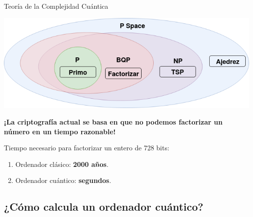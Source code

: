 \documentclass[11pt,compress]{beamer}
\begin{document}
\begin{frame}{Teoría de la Complejidad Cuántica}

  \includegraphics[width=\textwidth]{./images/complexity-zoo.png}

  \begin{tcolorbox}[colback=ChetwodeBlue!10,colframe=ChetwodeBlue!60]
    \begin{center}
      {\color{TurkishRose}\textbf{¡La criptografía actual se basa en que no podemos factorizar un número en un tiempo razonable!}}
    \end{center}
    Tiempo necesario para factorizar un entero de 728 bits:
    \begin{enumerate}
        \item Ordenador clásico: {\color{TurkishRose}\textbf{2000 años}}.
        \item Ordenador cuántico: \textbf{segundos}.
    \end{enumerate}
  \end{tcolorbox}

\end{frame}

\subsection{¿Cómo calcula un ordenador cuántico?}
\end{document}

